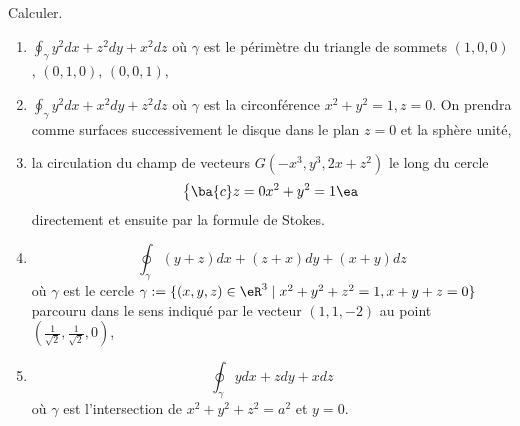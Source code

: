 
\begin{exercice}\label{exoVariete0017}

Calculer.
\begin{enumerate}
	\item 
		$\oint_\gamma y^2 dx + z^2 dy +x^2 dz$ où $\gamma$ est le périmètre du triangle de sommets $(1,0,0)$, $(0,1,0)$, $(0,0,1)$,

	\item
		$\oint_\gamma y^2 dx + x^2 dy +z^2 dz$ où $\gamma$ est la circonférence $x^2+y^2=1, z=0$. On prendra comme surfaces successivement le disque dans le  plan $z=0$ et la sphère unité,


	\item
		la circulation du champ de vecteurs $G(-x^3, y^3, 2x+z^2)$ le long du cercle $$\left\{\ba{c} z=0\\ x^2+y^2=1\ea \right. $$ directement et ensuite par la formule de Stokes. 
	\item 
		\[ \oint_{\gamma} (y+z)dx + (z+x)dy + (x+y) dz \]
		où $\gamma$ est le cercle $\gamma := \{ (x,y,z) \in \eR^3 \mid x^2+ y^2 + z^2 =1, x+y+z=0 \}$ parcouru dans le sens indiqué par le vecteur $(1,1,- 2)$ au point $(\frac{1}{\sqrt{2}},\frac{1}{\sqrt{2}},0)$,

	\item
		\begin{equation}			
			\oint_\gamma ydx+zdy+xdz
		\end{equation}
		où $\gamma$ est l'intersection de $x^2+y^2+z^2=a^2$ et $y=0$.
\end{enumerate}

\end{exercice}
